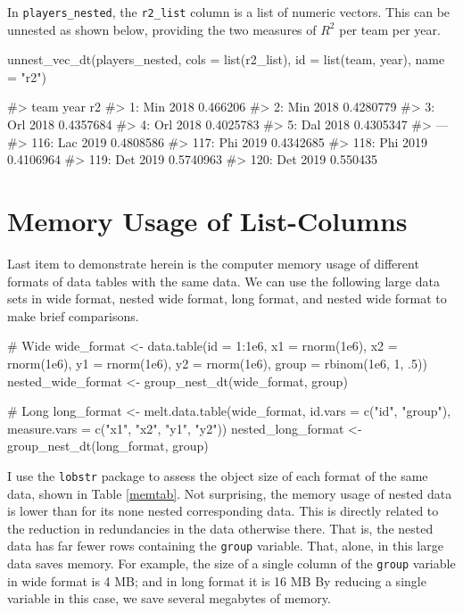 In \texttt{players\_nested}, the \texttt{r2\_list} column is a list of
numeric vectors. This can be unnested as shown below, providing the two
measures of \(R^2\) per team per year.

\begin{Schunk}
\begin{Sinput}
unnest_vec_dt(players_nested, 
              cols = list(r2_list), 
              id = list(team, year), 
              name = "r2")
\end{Sinput}
\begin{Soutput}
#>      team year        r2
#>   1:  Min 2018  0.466206
#>   2:  Min 2018 0.4280779
#>   3:  Orl 2018 0.4357684
#>   4:  Orl 2018 0.4025783
#>   5:  Dal 2018 0.4305347
#>  ---                    
#> 116:  Lac 2019 0.4808586
#> 117:  Phi 2019 0.4342685
#> 118:  Phi 2019 0.4106964
#> 119:  Det 2019 0.5740963
#> 120:  Det 2019  0.550435
\end{Soutput}
\end{Schunk}

\hypertarget{memory-usage-of-list-columns}{%
\section{Memory Usage of
List-Columns}\label{memory-usage-of-list-columns}}

Last item to demonstrate herein is the computer memory usage of
different formats of data tables with the same data. We can use the
following large data sets in wide format, nested wide format, long
format, and nested wide format to make brief comparisons.

\begin{Schunk}
\begin{Sinput}
# Wide
wide_format <- data.table(id = 1:1e6,
                          x1 = rnorm(1e6),
                          x2 = rnorm(1e6),
                          y1 = rnorm(1e6),
                          y2 = rnorm(1e6),
                          group = rbinom(1e6, 1, .5))
nested_wide_format <- group_nest_dt(wide_format, group)

# Long
long_format <- melt.data.table(wide_format, 
                               id.vars = c("id", "group"),
                               measure.vars = c("x1", "x2", "y1", "y2"))
nested_long_format <- group_nest_dt(long_format, group)
\end{Sinput}
\end{Schunk}

I use the \texttt{lobstr} package to assess the object size of each
format of the same data, shown in Table \ref{memtab}. Not surprising,
the memory usage of nested data is lower than for its none nested
corresponding data. This is directly related to the reduction in
redundancies in the data otherwise there. That is, the nested data has
far fewer rows containing the \texttt{group} variable. That, alone, in
this large data saves memory. For example, the size of a single column
of the \texttt{group} variable in wide format is 4 MB; and in long
format it is 16 MB By reducing a single variable in this case, we save
several megabytes of memory.

